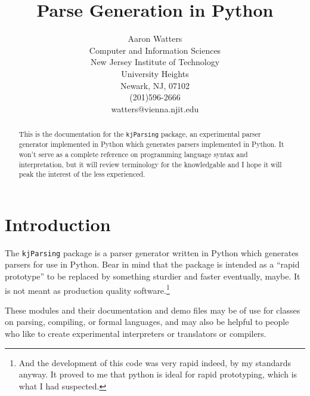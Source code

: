 
\textwidth=6.5in
\textheight=8.5in
\topmargin=0.0in
\oddsidemargin=0in
\evensidemargin=0in


\pagestyle{myheadings}


\title{Parse Generation in Python}
\author{Aaron Watters\\
	Computer and Information Sciences\\
	New Jersey Institute of Technology\\
	University Heights\\
	Newark, NJ, 07102\\
	(201)596-2666\\
	watters@vienna.njit.edu
	}

\newcommand{\triplespace}{\setlength{\baselineskip}{6mm}}
\newcommand{\untriple}{\setlength{\baselineskip}{4mm}}



\maketitle

\begin{abstract}
This is the documentation for the {\tt kjParsing} package,
an experimental parser generator implemented in Python which generates
parsers implemented in Python.
It won't serve as a complete reference on programming
language syntax and interpretation, but it will review
terminology for the knowledgable and I hope it will peak
the interest of the less experienced.
\end{abstract}

\section{Introduction}

The {\tt kjParsing} package is a parser generator written
in Python which generates parsers for use in Python.
Bear in mind that the package
is intended as a ``rapid prototype'' to be replaced
by something sturdier and faster eventually, maybe.
It is not meant as production quality 
software.\footnote{And the development of this code
was very rapid indeed, by my standards anyway.  It proved to
me that python is ideal for rapid prototyping,
which is what I had suspected.}

These modules and their documentation and demo files
may be of use for classes on parsing, compiling, or
formal languages, and may also be helpful to people
who like to create experimental interpreters or translators
or compilers.

